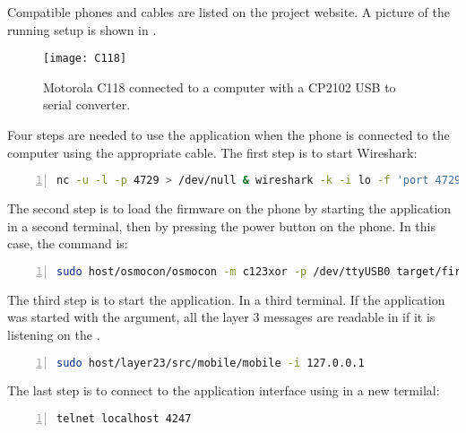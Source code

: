 Compatible phones and cables are listed on the project website. A
picture of the running setup is shown in .

     \begin{figure}[h]
        \centering
        \texttt{[image: C118]}
        \caption{Motorola C118 connected to a computer with a CP2102 USB
        to serial converter.}
        \label{fig:C118}
      \end{figure}

Four steps are needed to use the  application when the
phone is connected to the computer using the appropriate cable. The first
step is to start Wireshark:
      \begin{lstlisting}[language=bash, numbers=left,
basicstyle=\footnotesize, breaklines=true, frame=single]
nc -u -l -p 4729 > /dev/null & wireshark -k -i lo -f 'port 4729'
      \end{lstlisting}

The second step is to load the firmware on the phone by starting the
 application in a second terminal, then by pressing the
power button on the phone. In this case, the command is:

      \begin{lstlisting}[language=bash, numbers=left,
basicstyle=\footnotesize, breaklines=true, frame=single]
sudo host/osmocon/osmocon -m c123xor -p /dev/ttyUSB0 target/firmware/board/compal_e88/layer1.compalram.bin
      \end{lstlisting}

The third step is to start the  application. In a third
terminal. If the  application was started with the  argument, all the layer 3 messages are readable in
 if it is listening on the .

      \begin{lstlisting}[language=bash, numbers=left,
basicstyle=\footnotesize, breaklines=true, frame=single]
sudo host/layer23/src/mobile/mobile -i 127.0.0.1 
      \end{lstlisting}

The last step is to connect to the application interface using
 in a new termilal:
      \begin{lstlisting}[language=bash, numbers=left,
basicstyle=\footnotesize, breaklines=true, frame=single]
telnet localhost 4247
      \end{lstlisting}

